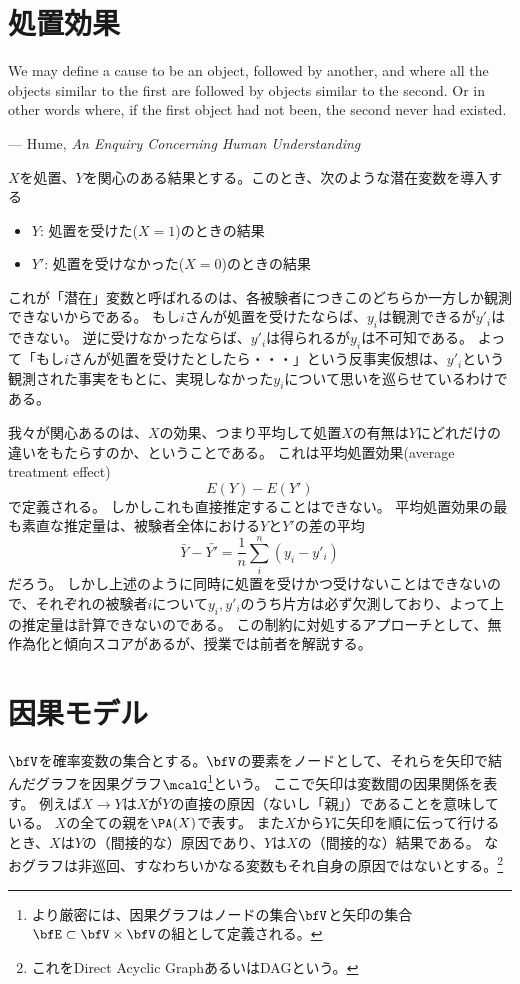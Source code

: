 \documentclass{jsarticle}
\begin{document}


\section{処置効果}
\epigraph{We may define a cause to be an object, followed by another, and where all the objects similar to the first are followed by objects similar to the second. Or in other words where, if the first object had not been, the second never had existed.}{--- Hume, \textit{An Enquiry Concerning Human Understanding}}

$X$を処置、$Y$を関心のある結果とする。このとき、次のような潜在変数を導入する
\begin{itemize}
 \item $Y$: 処置を受けた($X=1$)のときの結果
 \item $Y'$: 処置を受けなかった($X=0$)のときの結果
\end{itemize}
これが「潜在」変数と呼ばれるのは、各被験者につきこのどちらか一方しか観測できないからである。
もし$i$さんが処置を受けたならば、$y_i$は観測できるが$y'_i$はできない。
逆に受けなかったならば、$y'_i$は得られるが$y_i$は不可知である。
よって「もし$i$さんが処置を受けたとしたら・・・」という反事実仮想は、$y'_i$という観測された事実をもとに、実現しなかった$y_i$について思いを巡らせているわけである。

我々が関心あるのは、$X$の効果、つまり平均して処置$X$の有無は$Y$にどれだけの違いをもたらすのか、ということである。
これは平均処置効果(average treatment effect)
\[
 E(Y) - E(Y')
\]
で定義される。
しかしこれも直接推定することはできない。
平均処置効果の最も素直な推定量は、被験者全体における$Y$と$Y'$の差の平均
\[
 \bar{Y} - \bar{Y'} = \frac{1}{n} \sum_i^n (y_i - y'_i)
\]
だろう。
しかし上述のように同時に処置を受けかつ受けないことはできないので、それぞれの被験者$i$について$y_i, y'_i$のうち片方は必ず欠測しており、よって上の推定量は計算できないのである。
この制約に対処するアプローチとして、無作為化と傾向スコアがあるが、授業では前者を解説する。


\section{因果モデル}

$\bfV$を確率変数の集合とする。$\bfV$の要素をノードとして、それらを矢印で結んだグラフを因果グラフ$\mcalG$\footnote{より厳密には、因果グラフはノードの集合$\bfV$と矢印の集合$\bfE \subset \bfV \times \bfV$の組として定義される。}という。
ここで矢印は変数間の因果関係を表す。
例えば$X \rightarrow Y$は$X$が$Y$の直接の原因（ないし「親」）であることを意味している。
$X$の全ての親を$\PA(X)$で表す。
また$X$から$Y$に矢印を順に伝って行けるとき、$X$は$Y$の（間接的な）原因であり、$Y$は$X$の（間接的な）結果である。
なおグラフは非巡回、すなわちいかなる変数もそれ自身の原因ではないとする。\footnote{これをDirect Acyclic GraphあるいはDAGという。}
\end{document}

